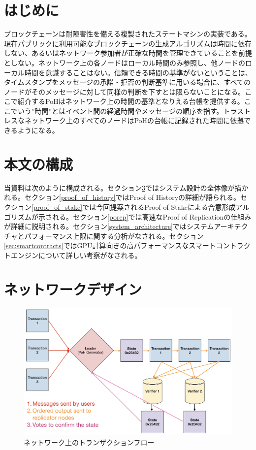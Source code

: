 \documentclass[12pt]{ltjsarticle}
\begin{document}
\section{はじめに}\normalsize
ブロックチェーンは耐障害性を備える複製されたステートマシンの実装である。現在パブリックに利用可能なブロックチェーンの生成アルゴリズムは時間に依存しない、あるいはネットワーク参加者が正確な時間を管理できていることを前提としない\cite{tendermint,hashgraph}。ネットワーク上の各ノードはローカル時間のみ参照し、他ノードのローカル時間を意識することはない。信頼できる時間の基準がないということは、タイムスタンプをメッセージの承諾・拒否の判断基準に用いる場合に、すべてのノードがそのメッセージに対して同様の判断を下すとは限らないことになる。ここで紹介するPoHはネットワーク上の時間の基準となりえる台帳を提供する。ここでいう”時間”とはイベント間の経過時間やメッセージの順序を指す。トラストレスなネットワーク上のすべてのノードはPoHの台帳に記録された時間に依拠できるようになる。

\section{本文の構成}
当資料は次のように構成される。セクション\ref{design}ではシステム設計の全体像が描かれる。セクション\ref{proof_of_history}ではProof of Historyの詳細が語られる。セクション\ref{proof_of_stake}では今回提案されるProof of Stakeによる合意形成アルゴリズムが示される。セクション\ref{porep}では高速なProof of Replicationの仕組みが詳細に説明される。セクション\ref{system_architecture}ではシステムアーキテクチャとパフォーマンス上限に関する分析がなされる。セクション\ref{sec:smartcontracts}ではGPU計算向きの高パフォーマンスなスマートコントラクトエンジンについて詳しい考察がなされる。

\section{ネットワークデザイン}\label{design}

\begin{figure}[h]
  \begin{center}
    \centering
    \includegraphics[width=\textwidth]{figures/network_design_001.png}
    \caption[Fig 1]{ネットワーク上のトランザクションフロー\label{fig:design}}
  \end{center}
  \end{figure}
\end{document}
